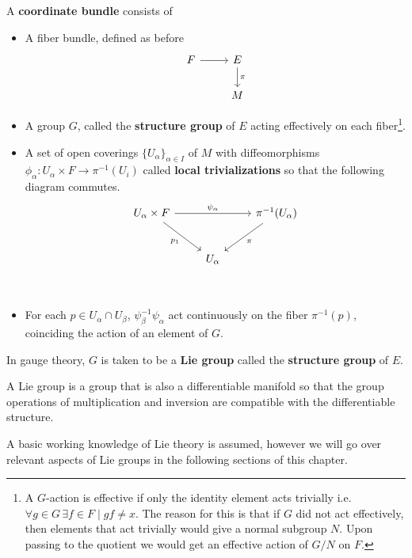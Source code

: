 	\begin{defn}
		A \textbf{coordinate bundle} consists of 
		\begin{itemize}
			\item A fiber bundle, defined as before
			\[
			\begin{tikzcd}
				F \arrow[r] & E  \arrow[d,"\pi"] \\ 
				& M
			\end{tikzcd}
			\]
			\item A group $G$, called the \textbf{structure group} of $E$ acting effectively on each fiber\footnote{A $G$-action is effective if only the identity element acts trivially i.e. $\forall g\in G \, \exists f \in F \mid gf \neq x$. The reason for this is that if $G$ did not act effectively, then elements that act trivially would give a normal subgroup $N$. Upon passing to the quotient we would get an effective action of $G/N$ on $F$.}.
			\item A set of open coverings $\{ U_\alpha \}_{\alpha \in I}$ of $M$ with diffeomorphisms $\phi_\alpha: U_\alpha \times F \rightarrow \pi^{-1} (U_i)$ called \textbf{local trivializations} so that the following diagram commutes. 
			\[
			\begin{tikzcd}[row sep=2.5em]
			U_\alpha \times F \arrow[dr,swap,"p_1"] \arrow{rr}{\psi_\alpha} && \pi^{-1}(U_\alpha) \arrow{dl}{\pi} \\
			 & U_\alpha \\
			\end{tikzcd}
			\]
			\item For each $p \in U_\alpha \cap U_\beta$, $\psi_\beta^{-1} \psi_\alpha$ act continuously on the fiber $\pi^{-1}(p)$, coinciding the action of an element of $G$.
		\end{itemize}
		
	\end{defn}
		
	In gauge theory, $G$ is taken to be a \textbf{Lie group} called the \textbf{structure group} of $E$.
	\begin{defn}
		A Lie group is a group that is also a differentiable manifold so that the group operations of multiplication and inversion are compatible with the  differentiable structure. 
	\end{defn}
	A basic working knowledge of Lie theory is assumed, however we will go over relevant aspects of Lie groups in the following sections of this chapter.
	
